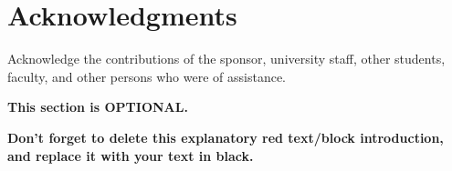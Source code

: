 \chapter{Acknowledgments} %

\begin{tcolorbox}[      %
    boxrule=0pt,        %
    colback=white,      %
    coltext=red         %
]                       %
    Acknowledge the contributions of the sponsor, university staff, other students, faculty, and other persons who were of assistance. 
    \vspace{15pt}
    
    \textbf{This section is OPTIONAL.}
    
    \vspace{15pt}       %
    \begin{center}      %
    \textbf{Don't forget to delete this explanatory red text/block introduction, and replace it with your text in black.}
    \end{center}        %
\end{tcolorbox}         %
